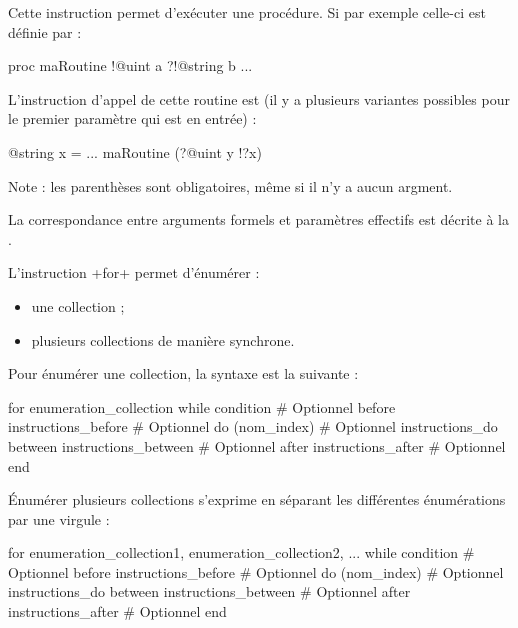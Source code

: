 

Cette instruction permet d'exécuter une procédure. Si par exemple celle-ci est définie par :
\begin{galgas}
proc maRoutine !@uint a ?!@string b {
  ...
}
\end{galgas}

L'instruction d'appel de cette routine est (il y a plusieurs variantes possibles pour le premier paramètre qui est en entrée) :
\begin{galgas}
@string x = ...
maRoutine (?@uint y !?x)
\end{galgas}

Note : les parenthèses sont obligatoires, même si il n'y a aucun argment.

La correspondance entre arguments formels et paramètres effectifs est décrite à la .





L'instruction \ggs+for+ permet d'énumérer :
\begin{itemize}
  \item une collection ;
  \item plusieurs collections de manière synchrone.
\end{itemize}

Pour énumérer une collection, la syntaxe est la suivante :

\begin{galgasbox}
for enumeration_collection
while condition # Optionnel
before instructions_before  # Optionnel
do 
  (nom_index) # Optionnel
  instructions_do
between instructions_between  # Optionnel
after instructions_after  # Optionnel
end
\end{galgasbox}


Énumérer plusieurs collections s'exprime en séparant les différentes énumérations par une virgule :
\begin{galgasbox}
for enumeration_collection1, enumeration_collection2, ...
while condition # Optionnel
before instructions_before  # Optionnel
do
  (nom_index) # Optionnel
  instructions_do
between instructions_between  # Optionnel
after instructions_after  # Optionnel
end
\end{galgasbox}


